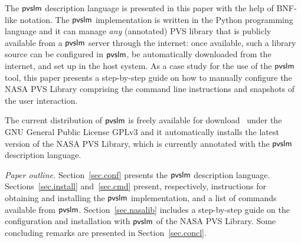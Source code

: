 The $\textsf{pvslm}$ description language is presented in this paper with the
help of BNF-like notation. The $\textsf{pvslm}$ implementation is written in
the Python programming language and it can manage {\em any}
(annotated) PVS library that is publicly available from a $\textsf{pvslm}$
server through the internet: once available, such a library source can
be configured in $\textsf{pvslm}$, be automatically downloaded from the
internet, and set up in the host system. As a case study for the use
of the $\textsf{pvslm}$ tool, this paper presents a step-by-step guide on how
to manually configure the NASA PVS Library comprising the command line
instructions and snapshots of the user interaction.

The current distribution of $\textsf{pvslm}$ is freely available for
download~\cite{pvslm} under the GNU General Public License GPLv3 and
it automatically installs the latest version of the NASA PVS Library,
which is currently annotated with the $\textsf{pvslm}$ description language.

\textit{Paper outline.} Section~\ref{sec.conf} presents the $\textsf{pvslm}$ 
description language. Sections~\ref{sec.install} and~\ref{sec.cmd} 
present, respectively, instructions for obtaining and installing the $\textsf{pvslm}$ 
implementation, and a list of commands available from $\textsf{pvslm}$. 
Section~\ref{sec.nasalib} includes a step-by-step guide on the configuration and
installation with $\textsf{pvslm}$ of the NASA PVS Library. Some concluding
remarks are presented in Section~\ref{sec.concl}.
